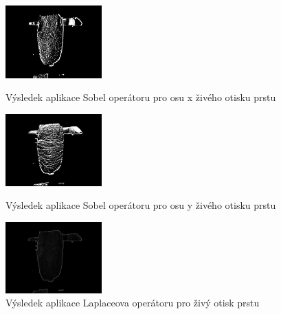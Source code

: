 \begin{figure}[!htbp]
  \begin{minipage}[b]{0.3\linewidth}
    \centering
    \includegraphics[width=140px]{obrazky-figures/sobelxlive.png}
    \caption{Výsledek aplikace Sobel operátoru pro osu x živého otisku prstu}
  \end{minipage}
  \hspace{0.3cm}
  \begin{minipage}[b]{0.3\linewidth}
    \centering
    \includegraphics[width=140px]{obrazky-figures/sobelylive.png}
    \caption{Výsledek aplikace Sobel operátoru pro osu y živého otisku prstu}
  \end{minipage}
  \hspace{0.3cm}
    \begin{minipage}[b]{0.3\linewidth}
    \centering
    \includegraphics[width=140px]{obrazky-figures/laplacianlive.png}
    \caption{Výsledek aplikace Laplaceova operátoru pro živý otisk prstu}
  \end{minipage}
\end{figure}

